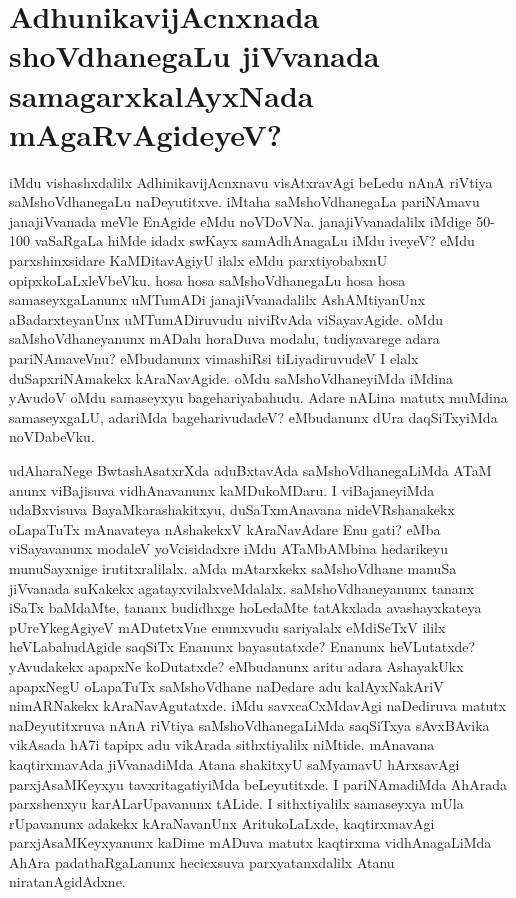 \section*{AdhunikavijAcnxnada shoVdhanegaLu jiVvanada samagarxkalAyxNada mAgaRvAgideyeV?}

iMdu vishashxdalilx AdhinikavijAcnxnavu visAtxravAgi beLedu nAnA riVtiya saMshoVdhanegaLu naDeyutitxve. iMtaha saMshoVdhanegaLa pariNAmavu janajiVvanada meVle EnAgide eMdu noVDoVNa. janajiVvanadalilx iMdige 50-100 vaSaRgaLa hiMde idadx swKayx samAdhAnagaLu iMdu iveyeV? eMdu parxshinxsidare KaMDitavAgiyU ilalx eMdu parxtiyobabxnU opipxkoLaLxleVbeVku. hosa hosa saMshoVdhanegaLu hosa hosa samaseyxgaLanunx uMTumADi janajiVvanadalilx AshAMtiyanUnx aBadarxteyanUnx uMTumADiruvudu niviRvAda viSayavAgide. oMdu saMshoVdhaneyanunx mADalu horaDuva modalu, tudiyavarege adara pariNAmaveVnu? eMbudanunx vimashiRsi tiLiyadiruvudeV I elalx duSapxriNAmakekx kAraNavAgide. oMdu saMshoVdhaneyiMda iMdina yAvudoV oMdu samaseyxyu bagehariyabahudu. Adare nALina matutx muMdina samaseyxgaLU, adariMda bageharivudadeV? eMbudanunx dUra daqSiTxyiMda noVDabeVku.

udAharaNege BwtashAsatxrXda aduBxtavAda saMshoVdhanegaLiMda ATaM anunx viBajisuva vidhAnavanunx kaMDukoMDaru. I viBajaneyiMda udaBxvisuva BayaMkarashakitxyu, duSaTxmAnavana nideVRshanakekx oLapaTuTx mAnavateya nAshakekxV kAraNavAdare Enu gati? eMba viSayavanunx modaleV yoVcisidadxre iMdu ATaMbAMbina hedarikeyu munuSayxnige irutitxralilalx. aMda mAtarxkekx saMshoVdhane manuSa jiVvanada suKakekx agatayxvilalxveMdalalx. saMshoVdhaneyanunx tananx iSaTx baMdaMte, tananx budidhxge hoLedaMte tatAkxlada avashayxkateya pUreYkegAgiyeV mADutetxVne enunxvudu sariyalalx eMdiSeTxV ililx heVLabahudAgide saqSiTx Enanunx bayasutatxde? Enanunx heVLutatxde? yAvudakekx apapxNe koDutatxde? eMbudanunx aritu adara AshayakUkx apapx‌NegU oLapaTuTx saMshoVdhane naDedare adu kalAyxNakAriV nimARNakekx kAraNavAgutatxde. iMdu savxcaCxMdavAgi naDediruva matutx naDeyutitxruva nAnA‌ riVtiya saMshoVdhanegaLiMda saqSiTxya sAvxBAvika vikAsada hA7i tapipx adu vikArada sithxtiyalilx niMtide. mAnavana kaqtirxmavAda jiVvanadiMda Atana shakitxyU saMyamavU hArxsavAgi parxjAsaMKeyxyu tavxritagatiyiMda beLeyutitxde. I pariNAmadiMda AhArada parxshenxyu karALarUpavanunx tALide. I sithxtiyalilx samaseyxya mUla rUpavanunx adakekx kAraNavanUnx AritukoLaLxde, kaqtirxmavAgi parxjAsaMKeyxyanunx kaDime mADuva matutx kaqtirxma vidhAnagaLiMda AhAra padathaRgaLanunx hecicxsuva parxyatanxdalilx Atanu niratanAgidAdxne. 

